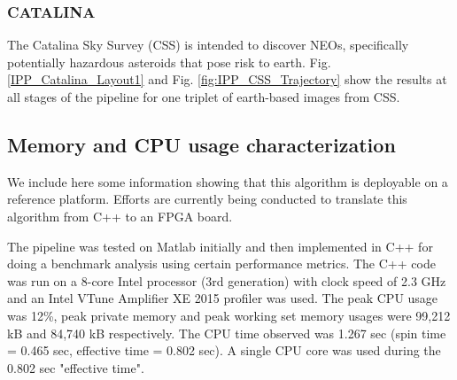 


\subsubsection{CATALINA}
The Catalina Sky Survey (CSS) is intended to discover NEOs, specifically potentially hazardous asteroids that pose risk to earth. Fig. \ref{IPP_Catalina_Layout1} and Fig. \ref{fig:IPP_CSS_Trajectory} show the results at all stages of the pipeline for one triplet of earth-based images from CSS.

\subsection{Memory and CPU usage characterization}
We include here some information showing  that this algorithm is deployable on a reference platform.
Efforts are currently being conducted to translate this algorithm from C++ to an FPGA board. 

The pipeline was tested on Matlab initially and then implemented in C++ for doing a benchmark analysis using certain performance metrics. The C++ code was run on a 8-core Intel processor (3rd generation) with clock speed of 2.3 GHz and an Intel VTune Amplifier XE 2015 profiler was used. The peak CPU usage was 12\%, peak private memory and peak working set memory usages were 99,212 kB and 84,740 kB respectively. The CPU time observed was 1.267 sec (spin time = 0.465 sec, effective time = 0.802 sec). A single CPU core was used during the 0.802 sec "effective time". \newline


